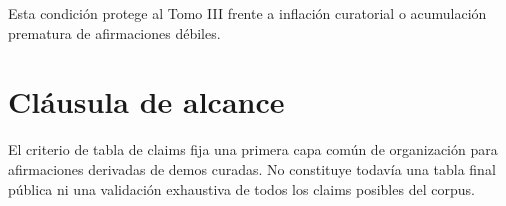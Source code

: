 \begin{observation}
Esta condición protege al Tomo III frente a inflación curatorial o acumulación prematura de afirmaciones débiles.
\end{observation}

\section{Cláusula de alcance}
\begin{observation}
El criterio de tabla de claims fija una primera capa común de organización para afirmaciones derivadas de demos curadas. No constituye todavía una tabla final pública ni una validación exhaustiva de todos los claims posibles del corpus.
\end{observation}

